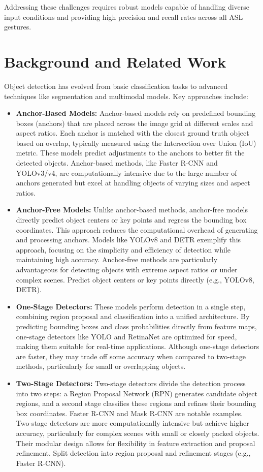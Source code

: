 \documentclass[a4paper]{article}
\begin{document}
Addressing these challenges requires robust models capable of handling diverse input conditions and providing high precision and recall rates across all ASL gestures.

\section{Background and Related Work}
Object detection has evolved from basic classification tasks to advanced techniques like segmentation and multimodal models. Key approaches include:
\begin{itemize}
    \item \textbf{Anchor-Based Models:} Anchor-based models rely on predefined bounding boxes (anchors) that are placed across the image grid at different scales and aspect ratios. Each anchor is matched with the closest ground truth object based on overlap, typically measured using the Intersection over Union (IoU) metric. These models predict adjustments to the anchors to better fit the detected objects. Anchor-based methods, like Faster R-CNN and YOLOv3/v4, are computationally intensive due to the large number of anchors generated but excel at handling objects of varying sizes and aspect ratios.
    \item \textbf{Anchor-Free Models:} Unlike anchor-based methods, anchor-free models directly predict object centers or key points and regress the bounding box coordinates. This approach reduces the computational overhead of generating and processing anchors. Models like YOLOv8 and DETR exemplify this approach, focusing on the simplicity and efficiency of detection while maintaining high accuracy. Anchor-free methods are particularly advantageous for detecting objects with extreme aspect ratios or under complex scenes. Predict object centers or key points directly (e.g., YOLOv8, DETR).
    \item \textbf{One-Stage Detectors:} These models perform detection in a single step, combining region proposal and classification into a unified architecture. By predicting bounding boxes and class probabilities directly from feature maps, one-stage detectors like YOLO and RetinaNet are optimized for speed, making them suitable for real-time applications. Although one-stage detectors are faster, they may trade off some accuracy when compared to two-stage methods, particularly for small or overlapping objects.
    \item \textbf{Two-Stage Detectors:} Two-stage detectors divide the detection process into two steps: a Region Proposal Network (RPN) generates candidate object regions, and a second stage classifies these regions and refines their bounding box coordinates. Faster R-CNN and Mask R-CNN are notable examples. Two-stage detectors are more computationally intensive but achieve higher accuracy, particularly for complex scenes with small or closely packed objects. Their modular design allows for flexibility in feature extraction and proposal refinement. Split detection into region proposal and refinement stages (e.g., Faster R-CNN).
\end{itemize}
\end{document}
